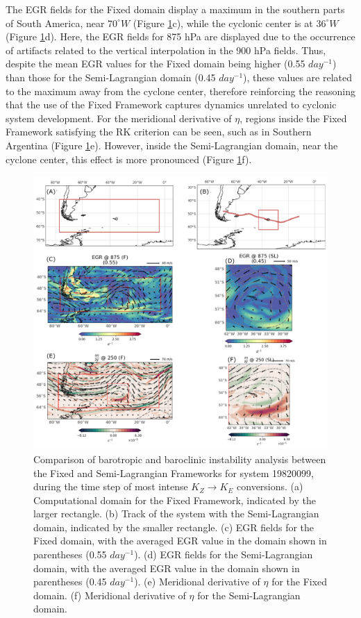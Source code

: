 The EGR fields for the Fixed domain display a maximum in the southern parts of South America, near $70^\circ W$ (Figure \ref{fig:panel_compare_fixed_sl}c), while the cyclonic center is at $36^\circ W$ (Figure \ref{fig:panel_compare_fixed_sl}d). Here, the EGR fields for 875 hPa are displayed due to the occurrence of artifacts related to the vertical interpolation in the 900 hPa fields. Thus, despite the mean EGR values for the Fixed domain being higher (0.55 $day^{-1}$) than those for the Semi-Lagrangian domain (0.45 $day^{-1}$), these values are related to the maximum away from the cyclone center, therefore reinforcing the reasoning that the use of the Fixed Framework captures dynamics unrelated to cyclonic system development. For the meridional derivative of $\eta$, regions inside the Fixed Framework satisfying the RK criterion can be seen, such as in Southern Argentina (Figure \ref{fig:panel_compare_fixed_sl}e). However, inside the Semi-Lagrangian domain, near the cyclone center, this effect is more pronounced (Figure \ref{fig:panel_compare_fixed_sl}f).

\begin{figure}[!htbp]
    \centering
    \includegraphics[width=\textwidth]{figs_6/panel_compare_fixed_sl.pdf}
    \caption[Comparative Analysis]{Comparison of barotropic and baroclinic instability analysis between the Fixed and Semi-Lagrangian Frameworks for system 19820099, during the time step of most intense $K_Z \rightarrow K_E$ conversions. (a) Computational domain for the Fixed Framework, indicated by the larger rectangle. (b) Track of the system with the Semi-Lagrangian domain, indicated by the smaller rectangle. (c) EGR fields for the Fixed domain, with the averaged EGR value in the domain shown in parentheses (0.55 $day^{-1}$). (d) EGR fields for the Semi-Lagrangian domain, with the averaged EGR value in the domain shown in parentheses (0.45 $day^{-1}$). (e) Meridional derivative of $\eta$ for the Fixed domain. (f) Meridional derivative of $\eta$ for the Semi-Lagrangian domain.}
    \label{fig:panel_compare_fixed_sl}
\end{figure}

